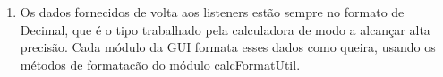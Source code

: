 \begin{enumerate}
\item Os dados fornecidos de volta aos listeners estão sempre no formato de Decimal, que é o tipo trabalhado pela 
calculadora de modo a alcançar alta precisão. Cada módulo da GUI formata esses dados como queira, usando os métodos 
de formatacão do módulo calcFormatUtil.


\end{enumerate}